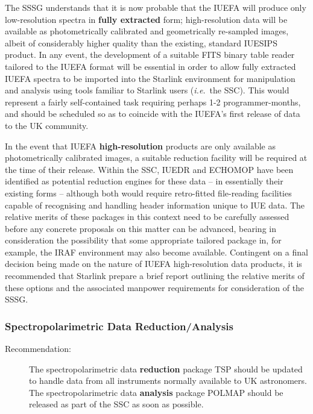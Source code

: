 The SSSG understands that it is now probable that the IUEFA will
produce only low-resolution spectra in {\bf fully extracted} form;
high-resolution data will be available as photometrically calibrated
and geometrically re-sampled images, albeit of considerably higher
quality than the existing, standard IUESIPS product.  In any event,
the development of a suitable FITS binary table reader tailored to the
IUEFA format will be essential in order to allow fully extracted IUEFA
spectra to be imported into the Starlink environment for manipulation
and analysis using tools familiar to Starlink users ({\em i.e.}\ the
SSC).  This would represent a fairly self-contained task requiring
perhaps 1-2 programmer-months, and should be scheduled so as to
coincide with the IUEFA's first release of data to the UK community.

In the event that IUEFA {\bf high-resolution} products are only
available as photometrically calibrated images, a suitable reduction
facility will be required at the time of their release.  Within the
SSC, IUEDR and ECHOMOP have been identified as potential reduction
engines for these data -- in essentially their existing forms --
although both would require retro-fitted file-reading facilities
capable of recognising and handling header information unique to IUE
data.  The relative merits of these packages in this context need to
be carefully assessed before any concrete proposals on this matter can
be advanced, bearing in consideration the possibility that some
appropriate tailored package in, for example, the IRAF environment may
also become available.  Contingent on a final decision being made on
the nature of IUEFA high-resolution data products, it is recommended
that Starlink prepare a brief report outlining the relative merits of
these options and the associated manpower requirements for
consideration of the SSSG.

\subsubsection{Spectropolarimetric Data Reduction/Analysis}

\begin{description}
\item[Recommendation:]
The spectropolarimetric data {\bf reduction} package TSP should be
updated to handle data from all instruments normally available to UK
astronomers.  The spectropolarimetric data {\bf analysis} package
POLMAP should be released as part of the SSC as soon as possible.
\end{description}

